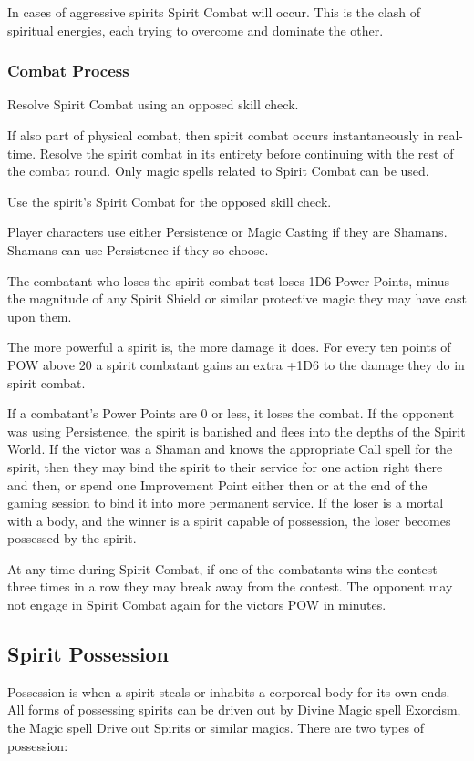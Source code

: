 In cases of aggressive spirits Spirit Combat will occur. This is the clash of spiritual energies, each trying to overcome and dominate the other.

\subsubsection{Combat Process}
\begin{rpg-list}
\item Resolve Spirit Combat using an opposed skill check.
\item If also part of physical combat, then spirit combat occurs instantaneously in real-time. Resolve the spirit combat in its entirety before continuing with the rest of the combat round. Only magic spells related to Spirit Combat can be used.
\item Use the spirit's Spirit Combat for the opposed skill check.
\item Player characters use either Persistence or Magic Casting if they are Shamans. Shamans can use Persistence if they so choose.
\item The combatant who loses the spirit combat test loses 1D6 Power Points, minus the magnitude of any Spirit Shield or similar protective magic they may have cast upon them.
\item The more powerful a spirit is, the more damage it does. For every ten points of POW above 20 a spirit combatant gains an extra +1D6 to the damage they do in spirit combat.
\item If a combatant’s Power Points are 0 or less, it loses the combat. If the opponent was using Persistence, the spirit is banished and flees into the depths of the Spirit World. If the victor was a Shaman and knows the appropriate Call spell for the spirit, then they may bind the spirit to their service for one action right there and then, or spend one Improvement Point either then or at the end of the gaming session to bind it into more permanent service. If the loser is a mortal with a body, and the winner is a spirit capable of possession, the loser becomes possessed by the spirit.
\item At any time during Spirit Combat, if one of the combatants wins the contest three times in a row they may break away from the contest. The opponent may not engage in Spirit Combat again for the victors POW in minutes.
\end{rpg-list}


\subsection{Spirit Possession}
Possession is when a spirit steals or inhabits a corporeal body for its own ends. All forms of possessing spirits can be driven out by Divine Magic spell Exorcism, the Magic spell Drive out Spirits or similar magics. There are two types of possession:

